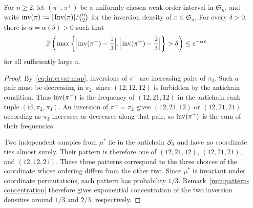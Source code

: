 \documentclass[11pt,letterpaper]{article}
\begin{document}
\begin{corollary}\label{cor:interval-inversions}
      For $n\ge2$, let $(\pi^-,\pi^+)$ be a uniformly chosen weak-order interval in $\mathfrak S_n$, and write $\operatorname{inv}(\pi):=|\operatorname{Inv}(\pi)|/\binom n2$ for the inversion density of $\pi\in\mathfrak S_n$. For every $\delta>0$, there is $\alpha=\alpha(\delta)>0$ such that
      \[
            \mathbb P\left(\max\left\{
            \Bigl|\operatorname{inv}(\pi^-)-\frac13\Bigr|, 
            \Bigl|\operatorname{inv}(\pi^+)-\frac23\Bigr|\right\}
            >\delta\right)\le e^{-\alpha n}
      \]
      for all sufficiently large $n$.
\end{corollary}
\begin{proof}
      By~\eqref{eq:interval-map}, inversions of $\pi^-$ are increasing pairs of $\pi_3$. Such a pair must be decreasing in $\pi_2$, since $(12,12,12)$ is forbidden by the antichain condition. Thus $\operatorname{inv}(\pi^-)$ is the frequency of $(12,21,12)$ in the antichain rank tuple $(\mathrm{id},\pi_2,\pi_3)$. An inversion of $\pi^+=\pi_2$ gives $(12,21,12)$ or $(12,21,21)$ according as $\pi_3$ increases or decreases along that pair, so $\operatorname{inv}(\pi^+)$ is the sum of their frequencies.

      Two independent samples from $\mu^\ast$ lie in the antichain $\mathcal S_3$ and have no coordinate ties almost surely. Their pattern is therefore one of $(12,21,12)$, $(12,21,21)$, and $(12,12,21)$. These three patterns correspond to the three choices of the coordinate whose ordering differs from the other two. Since $\mu^\ast$ is invariant under coordinate permutations, each pattern has probability $1/3$. Remark~\ref{rem:pattern-concentration} therefore gives exponential concentration of the two inversion densities around $1/3$ and $2/3$, respectively.
\end{proof}


\end{document}
